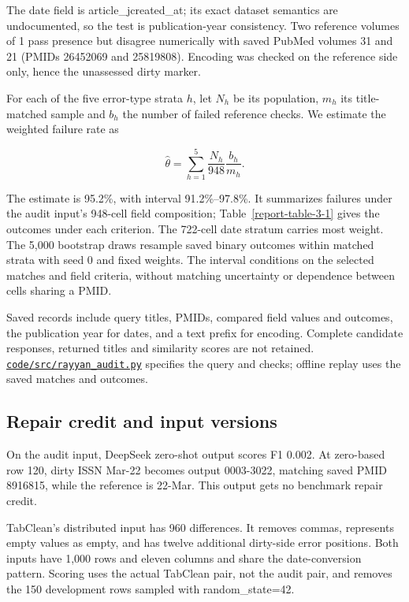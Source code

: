\documentclass[10pt,a4paper]{article}
\begin{document}
The date field is {\ttfamily\small article\_\allowbreak{}jcreated\_\allowbreak{}at}; its exact dataset semantics are undocumented, so the test is publication-year consistency. Two reference volumes of {\ttfamily\small 1} pass presence but disagree numerically with saved PubMed volumes {\ttfamily\small 31} and {\ttfamily\small 21} (PMIDs 26452069 and 25819808). Encoding was checked on the reference side only, hence the unassessed dirty marker.

For each of the five error-type strata \(h\), let \(N_h\) be its population, \(m_h\) its title-matched sample and \(b_h\) the number of failed reference checks. We estimate the weighted failure rate as

\[
\hat{\theta}=\sum_{h=1}^{5}\frac{N_h}{948}\frac{b_h}{m_h}.
\]

The estimate is 95.2\%, with interval 91.2\%--97.8\%. It summarizes failures under the audit input's 948-cell field composition; Table~\ref{report-table-3-1} gives the outcomes under each criterion. The 722-cell date stratum carries most weight. The 5,000 bootstrap draws resample saved binary outcomes within matched strata with seed 0 and fixed weights. The interval conditions on the selected matches and field criteria, without matching uncertainty or dependence between cells sharing a PMID.

Saved records include query titles, PMIDs, compared field values and outcomes, the publication year for dates, and a text prefix for encoding. Complete candidate responses, returned titles and similarity scores are not retained. \href{https://github.com/hinsonver/CoRe-Benchmark/blob/main/code/src/rayyan_audit.py}{\nolinkurl{code/src/rayyan_audit.py}} specifies the query and checks; offline replay uses the saved matches and outcomes.

\subsection{Repair credit and input versions}

On the audit input, DeepSeek zero-shot output scores F1 0.002. At zero-based row 120, dirty ISSN {\ttfamily\small Mar-22} becomes output {\ttfamily\small 0003-3022}, matching saved PMID 8916815, while the reference is {\ttfamily\small 22-Mar}. This output gets no benchmark repair credit.

TabClean's distributed input has 960 differences. It removes commas, represents empty values as {\ttfamily\small empty}, and has twelve additional dirty-side error positions. Both inputs have 1,000 rows and eleven columns and share the date-conversion pattern. Scoring uses the actual TabClean pair, not the audit pair, and removes the 150 development rows sampled with {\ttfamily\small random\_\allowbreak{}state=42}.
\end{document}
